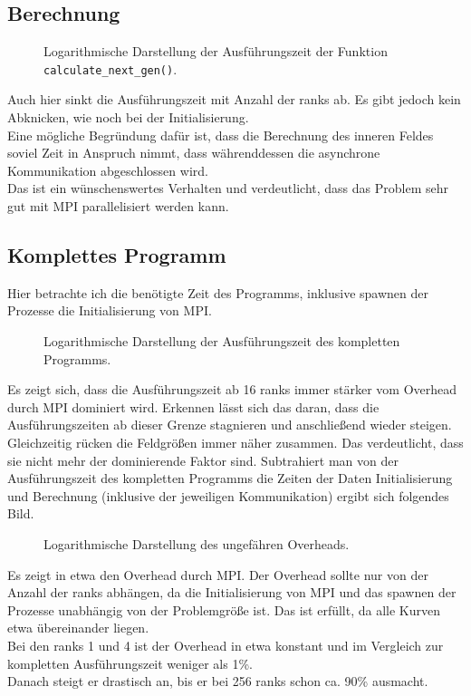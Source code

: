 \documentclass[german,plainarticle,hyperref,utf8]{zihpub}
\begin{document}
	\subsection{Berechnung}
	\begin{figure}[h]
		\centering
		
		\caption{Logarithmische Darstellung der Ausführungszeit der Funktion \texttt{calculate\_next\_gen()}.}
	\end{figure}
	Auch hier sinkt die Ausführungszeit mit Anzahl der ranks ab. Es gibt jedoch kein Abknicken, wie noch bei der Initialisierung.\\
	Eine mögliche Begründung dafür ist, dass die Berechnung des inneren Feldes soviel Zeit in Anspruch nimmt, dass währenddessen die asynchrone Kommunikation abgeschlossen wird.\\
	Das ist ein wünschenswertes Verhalten und verdeutlicht, dass das Problem sehr gut mit MPI parallelisiert werden kann.
	\clearpage
	\subsection{Komplettes Programm}
	Hier betrachte ich die benötigte Zeit des Programms, inklusive spawnen der Prozesse die Initialisierung von MPI.
	\begin{figure}[h]
		\centering
		
		\caption{Logarithmische Darstellung der Ausführungszeit des kompletten Programms.}
	\end{figure}

	Es zeigt sich, dass die Ausführungszeit ab 16 ranks immer stärker vom Overhead durch MPI dominiert wird. Erkennen lässt sich das daran, dass die Ausführungszeiten ab dieser Grenze stagnieren und anschließend wieder steigen. Gleichzeitig rücken die Feldgrößen immer näher zusammen. Das verdeutlicht, dass sie nicht mehr der dominierende Faktor sind.
	\clearpage
	Subtrahiert man von der Ausführungszeit des kompletten Programms die Zeiten der Daten Initialisierung und Berechnung (inklusive der jeweiligen Kommunikation) ergibt sich folgendes Bild.
	\begin{figure}[h]
		\centering
		
		\caption{Logarithmische Darstellung des ungefähren Overheads.}
	\end{figure}

	Es zeigt in etwa den Overhead durch MPI. Der Overhead sollte nur von der Anzahl der ranks abhängen, da die Initialisierung von MPI und das spawnen der Prozesse unabhängig von der Problemgröße ist. Das ist erfüllt, da alle Kurven etwa übereinander liegen.\\
	Bei den ranks 1 und 4 ist der Overhead in etwa konstant und im Vergleich zur kompletten Ausführungszeit weniger als 1\%.\\
	Danach steigt er drastisch an, bis er bei 256 ranks schon ca. 90\% ausmacht.\\
	
\end{document}
